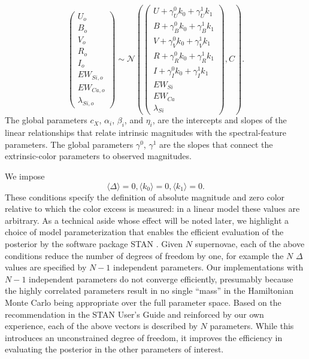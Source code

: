 \documentclass{aastex61}   	%
\begin{document}
\begin{equation}
\begin{pmatrix}
U_o\\B_o\\ V_o\\R_o\\I_o\\EW_{Si, o}\\ EW_{Ca, o} \\ \lambda_{Si, o}
\end{pmatrix}
\sim \mathcal{N}
\left(
\begin{pmatrix}
U +\gamma^0_{U} k_0 +\gamma^1_{U} k_1 \\B +\gamma^0_{B} k_0 +\gamma^1_{B} k_1 \\
V+\gamma^0_{V} k_0+\gamma^1_{V} k_1\\R+\gamma^0_{R} k_0 + \gamma^1_{R} k_1\\I+\gamma^0_{I} k_0+\gamma^1_{I} k_1\\
EW_{Si}\\ EW_{Ca} \\ \lambda_{Si}
\end{pmatrix}
,C
\right).
\label{dust:eqn}
\end{equation}
The global parameters $c_X$, $\alpha_i$, $\beta_i$,  and $\eta_i$,  are the intercepts and slopes of the linear relationships that
relate intrinsic magnitudes with the spectral-feature parameters.
The global parameters $\gamma^0$, $\gamma^1$  are the slopes that connect the extrinsic-color
parameters to observed magnitudes.

\color{orange}
We impose
\begin{equation}
\langle \Delta \rangle=0, \langle k_0 \rangle=0, \langle k_1 \rangle=0.
\end{equation}
These conditions specify the definition of absolute magnitude and zero color relative to which the color excess is measured:
in a linear model these values are arbitrary.
\color{orange}
As a technical aside whose effect will be noted later, we highlight a choice of model parameterization that enables the efficient evaluation of the
posterior by the software package
STAN \citep{stan}.  Given $N$ supernovae, each of the above conditions reduce the number of degrees of freedom by one,
for example  the $N$ $\Delta$ values are specified by $N-1$ independent parameters. 
Our implementations
with $N-1$ independent parameters do not converge efficiently, presumably because the highly correlated parameters result in
no single ``mass'' in the Hamiltonian Monte Carlo being appropriate over the full parameter space.  
Based on the recommendation in the STAN User's Guide
and reinforced by our own experience, each of the above vectors is described by $N$ parameters.  While this introduces an unconstrained
degree of freedom, it improves the efficiency in evaluating the posterior in the other parameters of interest.
\end{document}

